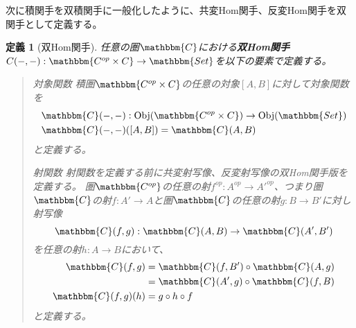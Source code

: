 \documentclass[uplatex,dvipdfmx]{jsarticle}
\newcommand{\cat}[1]{\mathbbm{#1}}
\newcommand{\arrow}{\rightarrow}
\newcommand{\functor}[3]{#1:\cat{#2}\arrow \cat{#3}}
\newcommand{\obj}[1]{\mathrm{Obj}(\cat{#1})}
\newcommand{\mor}[3]{#1:#2\arrow #3}
\newcommand{\arset}[3]{\cat{#1}(#2,#3)}
\newtheorem{define}[proof]{定義}
\numberwithin{proof}{subsection}
\newenvironment{mydescription}
{\begin{description}
  \setlength{\parskip}{0.5cm}
}
{\end{description}}
\begin{document}
	次に積関手を双積関手に一般化したように、共変Hom関手、反変Hom関手を双関手として定義する。
	\begin{define}[双Hom関手]
		任意の圏$\cat{C}$における\textbf{双Hom関手}$\functor{C(-,-)}{C^{op}\times C}{Set}$を以下の要素で定義する。
		\begin{quote}
			\begin{mydescription}
				\item[対象関数] 積圏$\cat{C^{op}\times C}$の任意の対象$[A,B]$に対して対象関数を
				\begin{align*}
					&\mor{\arset{C}{-}{-}}{\obj{C^{op}\times C}}{\obj{Set}}\\
					&\arset{C}{-}{-}([A,B])=\arset{C}{A}{B}
				\end{align*}
				と定義する。
				\item[射関数]射関数を定義する前に共変射写像、反変射写像の双Hom関手版を定義する。
				圏$\cat{C^{op}}$の任意の射$\mor{f^{op}}{A^{op}}{A'^{op}}$、つまり圏$\cat{C}$の射$\mor{f}{A'}{A}$と圏$\cat{C}$の任意の射$\mor{g}{B}{B'}$に対し射写像\[\mor{\arset{C}{f}{g}}{\arset{C}{A}{B}}{\arset{C}{A'}{B'}}\]を任意の射$\mor{h}{A}{B}$において、
				\begin{align*}
					\arset{C}{f}{g}&=\arset{C}{f}{B'}\circ\arset{C}{A}{g}\\
					&=\arset{C}{A'}{g}\circ\arset{C}{f}{B}\\
					\arset{C}{f}{g}(h)&=g\circ h\circ f\\
				\end{align*}
				と定義する。

				\begin{center}
				\end{center}


\end{mydescription}
\end{quote}
\end{define}
\end{document}
